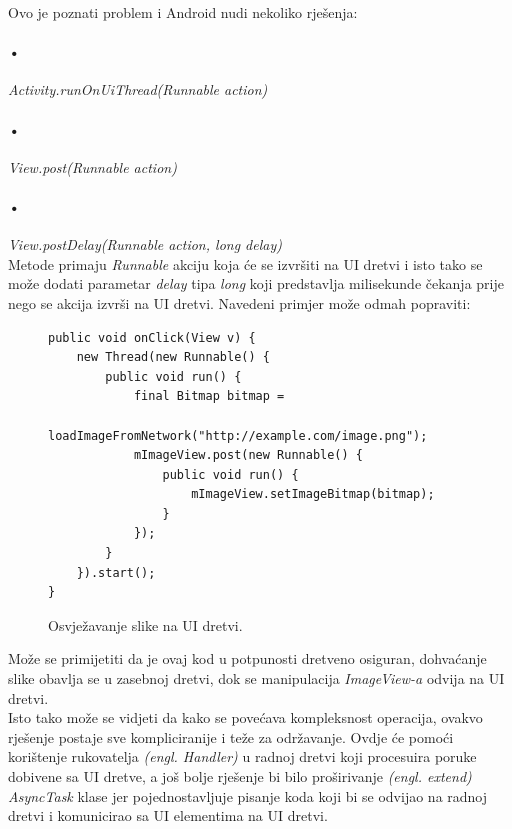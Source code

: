 \documentclass[times, utf8, zavrsni]{fer}
\begin{document}
Ovo je poznati problem i Android nudi nekoliko rješenja:
\paragraph{•}
\textit{Activity.runOnUiThread(Runnable action)}
\paragraph{•}
\textit{View.post(Runnable action)}
\paragraph{•}
\textit{View.postDelay(Runnable action, long delay)
}\\

Metode primaju \textit{Runnable} akciju koja će se izvršiti na UI dretvi i isto tako se može dodati parametar \textit{delay} tipa \textit{long} koji predstavlja milisekunde čekanja prije nego se akcija izvrši na UI dretvi.\newpage 
Navedeni primjer može odmah popraviti:

\begin{figure}[ht!]
\begin{lstlisting}
public void onClick(View v) {
    new Thread(new Runnable() {
        public void run() {
            final Bitmap bitmap =
                    loadImageFromNetwork("http://example.com/image.png");
            mImageView.post(new Runnable() {
                public void run() {
                    mImageView.setImageBitmap(bitmap);
                }
            });
        }
    }).start();
}
\end{lstlisting}
\caption{Osvježavanje slike na UI dretvi.}
\label{overflow}
\end{figure}

Može se primijetiti da je ovaj kod u potpunosti dretveno osiguran, dohvaćanje slike obavlja se u zasebnoj dretvi, dok se manipulacija \textit{ImageView-a} odvija na UI dretvi.\\

Isto tako može se vidjeti da kako se povećava kompleksnost operacija, ovakvo rješenje postaje sve kompliciranije i teže za održavanje. Ovdje će pomoći korištenje rukovatelja \textit{(engl. Handler)} u radnoj dretvi koji procesuira poruke dobivene sa UI dretve, a još bolje rješenje bi bilo proširivanje \textit{(engl. extend)} \textit{AsyncTask} klase jer pojednostavljuje pisanje koda koji bi se odvijao na radnoj dretvi i komunicirao sa UI elementima na UI dretvi.
\end{document}
